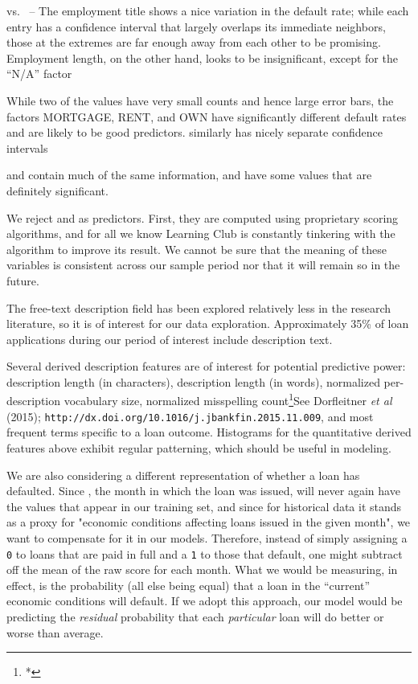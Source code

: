  vs.\  -- The employment title shows a nice variation in the default rate; while each entry has a confidence interval that largely overlaps its immediate neighbors, those at the extremes are far enough away from each other to be promising. Employment length, on the other hand, looks to be insignificant, except for the “N/A” factor

 While two of the values have very small counts and hence large error bars, the factors MORTGAGE, RENT, and OWN have significantly different default rates and are likely to be good predictors.  similarly has nicely separate confidence intervals

 and  contain much of the same information, and have some values that are definitely significant.

We reject  and  as predictors. First, they are computed using proprietary scoring algorithms, and for all we know Learning Club is constantly tinkering with the algorithm to improve its result. We cannot be sure that the meaning of these variables is consistent across our sample period nor that it will remain so in the future.

The free-text description field has been explored relatively less in
the research literature, so it is of interest for our data
exploration. Approximately 35\% of loan applications during our period
of interest include description text.

Several derived description features are of interest for potential
predictive power: description length (in characters), description
length (in words), normalized per-description vocabulary size,
normalized misspelling count\footnote{*}{See Dorfleitner {\it et al}
(2015); {\tt http://dx.doi.org/10.1016/j.jbankfin.2015.11.009}}, and
most frequent terms specific to a loan outcome. Histograms for the
quantitative derived features above exhibit regular patterning, which
should be useful in modeling.

We are also considering a different representation of whether a loan
has defaulted. Since , the month in which the loan was
issued, will never again have the values that appear in our training
set, and since for historical data it stands as a proxy for "economic
conditions affecting loans issued in the given month", we want to
compensate for it in our models. Therefore, instead of simply
assigning a {\tt 0} to loans that are paid in full and a {\tt 1} to
those that default, one might subtract off the mean of the raw score
for each month. What we would be measuring, in effect, is the
probability (all else being equal) that a loan in the ``current''
economic conditions will default. If we adopt this approach, our model
would be predicting the {\it residual} probability that each {\it
particular} loan will do better or worse than average.

